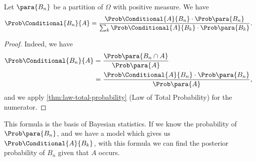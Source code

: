 \begin{theorem}
    \label{thm:bayes}%
    Let \(\para{B_n}\) be a partition of \(\Omega\) with positive measure. We have
    \[
        \Prob\Conditional{B_n}{A} = \frac{\Prob\Conditional{A}{B_n} \cdot \Prob\para{B_n}}{\sum_{k} \Prob\Conditional{A}{B_k} \cdot \Prob\para{B_k}}.
    \]
\end{theorem}

\begin{proof}
    Indeed, we have
    \begin{align*}
        \Prob\Conditional{B_n}{A} &= \frac{\Prob\para{B_n \cap A}}{\Prob\para{A}} \\
        &= \frac{\Prob\Conditional{A}{B_n} \cdot \Prob\para{B_n}}{\Prob\para{A}},
    \end{align*}
    and we apply \autoref{thm:law-total-probability} (Law of Total Probability) for the numerator.
\end{proof}

This formula is the basis of Bayesian statistics. If we know the probability of \(\Prob\para{B_n}\), and we have a model which gives us \(\Prob\Conditional{A}{B_k}\), with this formula we can find the posterior probability of \(B_n\) given that \(A\) occurs.

